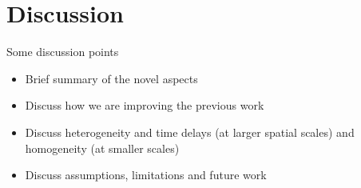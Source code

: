 \documentclass[journal,a4paper]{IEEEtran}
\begin{document}
\section{Discussion}
Some discussion points
\begin{itemize}
	\item Brief summary of the novel aspects
	\item Discuss how we are improving the previous work
	\item Discuss heterogeneity and time delays (at larger spatial scales) and homogeneity (at smaller scales) 
	\item Discuss assumptions, limitations and future work
\end{itemize}


\end{document}
